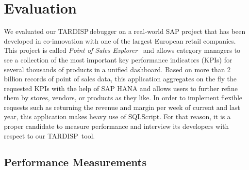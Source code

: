 \documentclass[english,conference]{IEEEtran}
\newcommand{\todo}[2][]{\pdfmargincomment[author={#1}]{#2}}
\newcommand{\linerefn}[2]{\hyperref[#1]{line~#2}}
\newcommand{\tool}{TAR\-DISP}
\begin{document}

%


\section{Evaluation}
\label{sec:evaluation}

We evaluated our \tool\,debugger on a real-world SAP project that has been developed in co-innovation with one of the largest European retail companies. 
This project is called \emph{Point of Sales Explorer}~\cite{plattner2015memory} and allows category managers to see a collection of the most important key performance indicators (KPIs) for several thousands of products in a unified dashboard.
Based on more than 2 billion records of point of sales data, this application aggregates on the fly the requested KPIs with the help of SAP HANA and allows users to further refine them by stores, vendors, or products as they like. 
In order to implement flexible requests such as returning the revenue and margin per week of current and last year, this application makes heavy use of SQLScript. 
For that reason, it is a proper candidate to measure performance and interview its developers with respect to our \tool\ tool. 

\subsection{Performance Measurements}
\end{document}
